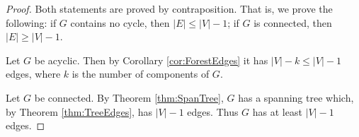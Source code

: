 \begin{proof}
Both statements are proved by contraposition.
That is, we prove the following: if $G$ contains no cycle, then $|E| \le |V| - 1$; if $G$ is connected, then $|E| \ge |V| - 1$.

Let $G$ be acyclic.
Then by Corollary \ref{cor:ForestEdges} it has $|V| - k \le |V| - 1$ edges, where $k$ is the number of components of $G$.

Let $G$ be connected.
By Theorem \ref{thm:SpanTree}, $G$ has a spanning tree which, by Theorem \ref{thm:TreeEdges}, has $|V| - 1$ edges.
Thus $G$ has at least $|V| - 1$ edges.
\end{proof}



